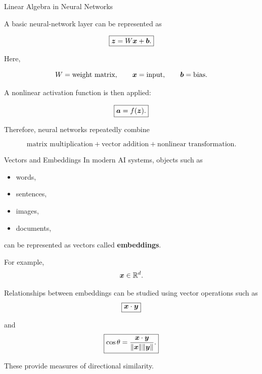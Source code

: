 
\begin{frame}{Linear Algebra in Neural Networks}

A basic neural-network layer can be represented as

\[
\boxed{
\bm{z}=W\bm{x}+\bm{b}.
}
\]

Here,

\[
W=\text{weight matrix},
\qquad
\bm{x}=\text{input},
\qquad
\bm{b}=\text{bias}.
\]

A nonlinear activation function is then applied:

\[
\boxed{
\bm{a}=f(\bm{z}).
}
\]

Therefore, neural networks repeatedly combine

\[
\boxed{
\text{matrix multiplication}
+
\text{vector addition}
+
\text{nonlinear transformation}.
}
\]

\end{frame}



\begin{frame}{Vectors and Embeddings}
\vspace{-0.1cm}
In modern AI systems, objects such as

\begin{itemize}
    \item words,
    \item sentences,
    \item images,
    \item documents,
\end{itemize}

can be represented as vectors called \textbf{embeddings}.

For example,
\vspace{-0.1cm}
\[
\bm{x}\in\mathbb{R}^{d}.
\]

Relationships between embeddings can be studied using
vector operations such as
\vspace{-0.1cm}
\[
\boxed{
\bm{x}\cdot\bm{y}
}
\]

and
\vspace{-0.1cm}
\[
\boxed{
\cos\theta
=
\frac{\bm{x}\cdot\bm{y}}
{\|\bm{x}\|\|\bm{y}\|}.
}
\]

These provide measures of directional similarity.

\end{frame}


